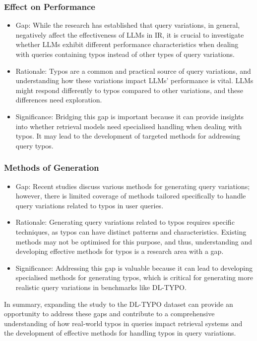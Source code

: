 \subsubsection{Effect on Performance}
\begin{itemize}
    \item Gap: While the research has established that query variations, in general, negatively affect the effectiveness of LLMs in IR, it is crucial to investigate whether LLMs exhibit different performance characteristics when dealing with queries containing typos instead of other types of query variations.
    \item Rationale: Typos are a common and practical source of query variations, and understanding how these variations impact LLMs' performance is vital. LLMs might respond differently to typos compared to other variations, and these differences need exploration.
    \item Significance: Bridging this gap is important because it can provide insights into whether retrieval models need specialised handling when dealing with typos. It may lead to the development of targeted methods for addressing query typos.
\end{itemize}

\subsubsection{Methods of Generation}
\begin{itemize}
    \item Gap: Recent studies discuss various methods for generating query variations; however, there is limited coverage of methods tailored specifically to handle query variations related to typos in user queries.
    \item Rationale: Generating query variations related to typos requires specific techniques, as typos can have distinct patterns and characteristics. Existing methods may not be optimised for this purpose, and thus, understanding and developing effective methods for typos is a research area with a gap.
    \item Significance: Addressing this gap is valuable because it can lead to developing specialised methods for generating typos, which is critical for generating more realistic query variations in benchmarks like DL-TYPO.
\end{itemize}

In summary, expanding the study to the DL-TYPO dataset can provide an opportunity to address these gaps and contribute to a comprehensive understanding of how real-world typos in queries impact retrieval systems and the development of effective methods for handling typos in query variations.